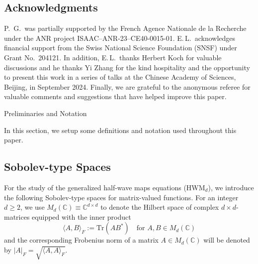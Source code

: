 \documentclass[11pt,reqno]{amsart}
\makeatletter
\theoremstyle{definition}
\theoremstyle{remark}
\theoremstyle{remark}
\numberwithin{equation}{section}
\newcommand{\C}{\mathbb{C}}
\newcommand{\Tr}{\mathrm{Tr}}
\def\section{\@startsection{section}{1}%
  \z@{1.5\linespacing\@plus\linespacing}{.5\linespacing}%
  {\normalfont\bfseries\large\centering}}
\makeatother
\begin{document}
\subsection*{Acknowledgments} P.~G.~was partially supported by the French Agence Nationale de la Recherche under the ANR project ISAAC–ANR-23–CE40-0015-01. E.\,L.~acknowledges financial support from the Swiss National Science Foundation (SNSF) under Grant No.~204121. In addition, E.\,L.~thanks Herbert Koch for valuable discussions and he thanks Yi Zhang for the kind hospitality and the opportunity to present this  work in a series of talks at the Chinese Academy of Sciences, Beijing, in September 2024.  Finally, we are grateful to the anonymous referee for valuable comments and suggestions that have helped improve this paper.

\section{Preliminaries and Notation} \label{sec:prelim}

In this section, we setup some definitions and notation used throughout this paper. 

\subsection*{Sobolev-type  Spaces} For the study of the generalized half-wave maps equations (HWM$_d$), we introduce the following Sobolev-type spaces for matrix-valued functions. For an integer $d \geq 2$, we use $M_d(\C) \equiv \C^{d \times d}$ to denote the Hilbert space of complex $d \times d$-matrices equipped with the inner product 
$$
\langle A, B \rangle_F := \Tr( A B^*) \quad \mbox{for $A,B \in M_d(\C)$} 
 $$
and the corresponding Frobenius norm of a matrix $A \in M_d(\C)$ will be denoted by $| A |_F = \sqrt{\langle A, A \rangle_F}$. 
\end{document}
